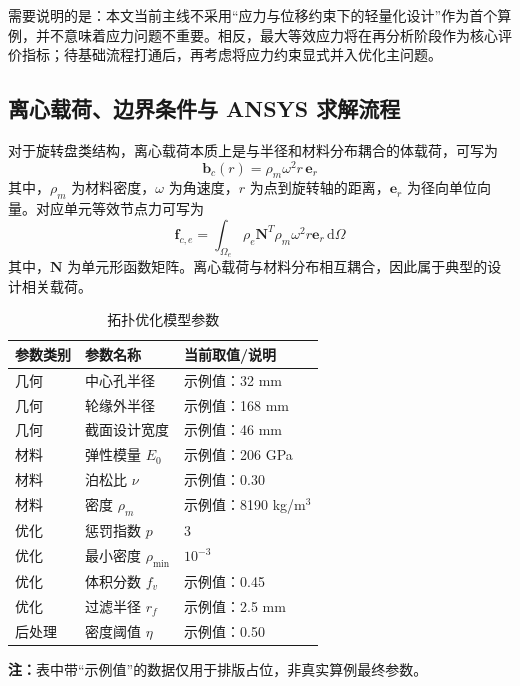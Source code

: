 \documentclass{FRB-style}
\begin{document}
需要说明的是：本文当前主线不采用“应力与位移约束下的轻量化设计”作为首个算例，并不意味着应力问题不重要。相反，最大等效应力将在再分析阶段作为核心评价指标；待基础流程打通后，再考虑将应力约束显式并入优化主问题。

\subsection{离心载荷、边界条件与 ANSYS 求解流程}

对于旋转盘类结构，离心载荷本质上是与半径和材料分布耦合的体载荷，可写为
\begin{equation}
\mathbf{b}_c(r)=\rho_m \omega^2 r \,\mathbf{e}_r
\end{equation}
其中，$\rho_m$ 为材料密度，$\omega$ 为角速度，$r$ 为点到旋转轴的距离，$\mathbf{e}_r$ 为径向单位向量。对应单元等效节点力可写为
\begin{equation}
\mathbf{f}_{c,e}
=
\int_{\Omega_e}
\rho_e \mathbf{N}^{T} \rho_m \omega^2 r \mathbf{e}_r
\,\mathrm{d}\Omega
\end{equation}
其中，$\mathbf{N}$ 为单元形函数矩阵。离心载荷与材料分布相互耦合，因此属于典型的设计相关载荷\cite{Chen2001,Bourdin2003,Han2021}。

\begin{table}[H]
\centering
\caption{拓扑优化模型参数}
\begin{tabular}{lll}
\toprule
参数类别 & 参数名称 & 当前取值/说明 \\
\midrule
几何 & 中心孔半径 & 示例值：32 mm \\
几何 & 轮缘外半径 & 示例值：168 mm \\
几何 & 截面设计宽度 & 示例值：46 mm \\
材料 & 弹性模量 $E_0$ & 示例值：206 GPa \\
材料 & 泊松比 $\nu$ & 示例值：0.30 \\
材料 & 密度 $\rho_m$ & 示例值：8190 kg/m$^3$ \\
优化 & 惩罚指数 $p$ & 3 \\
优化 & 最小密度 $\rho_{\min}$ & $10^{-3}$ \\
优化 & 体积分数 $f_v$ & 示例值：0.45 \\
优化 & 过滤半径 $r_f$ & 示例值：2.5 mm \\
后处理 & 密度阈值 $\eta$ & 示例值：0.50 \\
\bottomrule
\end{tabular}

\vspace{1mm}
\noindent\textbf{注：}表中带“示例值”的数据仅用于排版占位，非真实算例最终参数。
\end{table}
\end{document}
